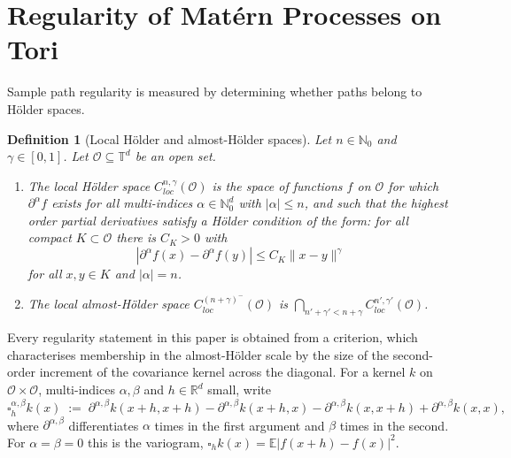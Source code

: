 \documentclass[pdflatex,sn-mathphys,Numbered]{sn-jnl}
\theoremstyle{thmstyleone}%
\theoremstyle{thmstyletwo}%
\theoremstyle{thmstylethree}%
\newtheorem{definition}[theorem]{Definition}%
\newcommand{\RR}{\mathbb{R}}
\newcommand{\NN}{\mathbb{N}}
\newcommand{\TT}{\mathbb{T}}
\newcommand{\calO}{\mathcal{O}}
\newcommand{\E}{\mathbb{E}}
\begin{document}
\section{Regularity of Mat\'ern Processes on Tori}
\label{sec:regularity}

Sample path regularity is measured by determining whether paths belong to
H\"older spaces.

\begin{definition}[Local H\"older and almost-H\"older spaces]\label{def: holder}
    Let $n \in \NN_0$ and $\gamma \in [0,1]$. Let $\calO \subseteq \TT^d$ be an open set.
    \begin{enumerate}
        \item The local H\"older space $C^{n,\gamma}_{loc}(\calO)$ is the space of functions $f$ on $\calO$ for which $\partial ^{\alpha} f$ exists for all multi-indices $\alpha \in \NN_0^d$ with $|\alpha| \leq n$, and such that the highest order partial derivatives satisfy a H\"older condition of the form: for all compact $K \subset \calO$ there is $C_K>0$ with
            $$|\partial ^{\alpha} f(x) -\partial ^{\alpha} f(y)| \leq C_K\|x-y\|^\gamma$$
            for all $x,y \in K$ and $|\alpha|=n$.
    \item The local almost-H\"older space $C^{(n+\gamma)^-}_{loc}(\calO)$ is $\bigcap_{n'+\gamma'<n+\gamma}C^{n',\gamma'}_{loc}(\calO)$.
    \end{enumerate}
\end{definition}

Every regularity statement in this paper is obtained from a criterion, which
characterises membership in the almost-H\"older scale by the size of
the second-order increment of the covariance kernel across the diagonal. For a
kernel $k$ on $\calO\times\calO$, multi-indices $\alpha,\beta$ and $h \in \RR^d$
small, write
\begin{equation}\label{eq:box}
    \square^{\alpha,\beta}_h k(x)
    \;:=\; \partial^{\alpha,\beta}k(x+h,x+h) - \partial^{\alpha,\beta}k(x+h,x)
         - \partial^{\alpha,\beta}k(x,x+h) + \partial^{\alpha,\beta}k(x,x) ,
\end{equation}
where $\partial^{\alpha,\beta}$ differentiates $\alpha$ times in the first
argument and $\beta$ times in the second. For $\alpha=\beta=0$ this is the
variogram, $\square_h k(x) = \E|f(x+h)-f(x)|^2$.
\end{document}
